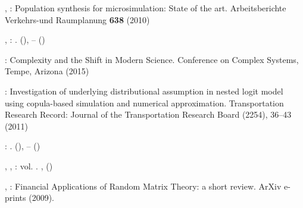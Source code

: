 \documentclass{article}
\begin{document}
\begin{thebibliography}{43}
\begin{botherref}
,
:
Population synthesis for microsimulation: State of the art.
Arbeitsberichte Verkehrs-und Raumplanung
\textbf{638}
(2010)
\end{botherref}
\endbibitem

\begin{barticle}
,
:
.
(),
--
()
\end{barticle}
\endbibitem

\begin{botherref}
:
Complexity and the Shift in Modern Science.
Conference on Complex Systems, Tempe, Arizona
(2015)
\end{botherref}
\endbibitem

\begin{botherref}
:
Investigation of underlying distributional assumption in nested logit model
  using copula-based simulation and numerical approximation.
Transportation Research Record: Journal of the Transportation Research Board
(2254),
36--43
(2011)
\end{botherref}
\endbibitem

\begin{barticle}
:
.
(),
--
()
\end{barticle}
\endbibitem

\begin{bbook}
,
, \betal:
vol. .
, 
()
\end{bbook}
\endbibitem

\begin{botherref}
,
:
{Financial Applications of Random Matrix Theory: a short review}.
ArXiv e-prints
(2009).
\end{botherref}
\endbibitem


\end{thebibliography}
\end{document}
